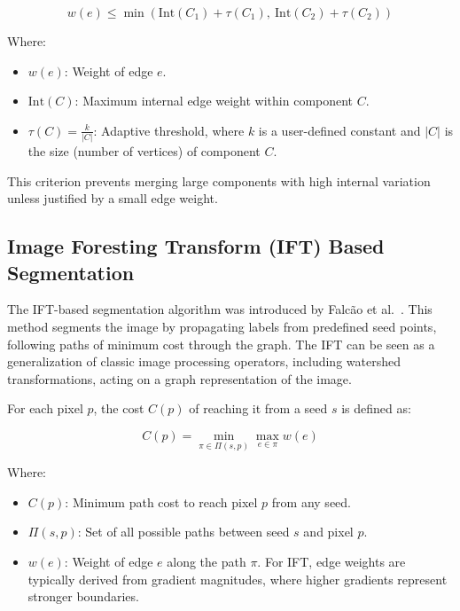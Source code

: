 \documentclass{sbc2023}
\begin{document}
\begin{equation}
w(e) \leq \min\left(\text{Int}(C_1) + \tau(C_1),\ \text{Int}(C_2) + \tau(C_2)\right)
\label{eq:mst_condition}
\end{equation}

Where:

\begin{itemize}
    \item \( w(e) \): Weight of edge \( e \).
    \item \( \text{Int}(C) \): Maximum internal edge weight within component \( C \).
    \item \( \tau(C) = \frac{k}{|C|} \): Adaptive threshold, where \( k \) is a user-defined constant and \( |C| \) is the size (number of vertices) of component \( C \).
\end{itemize}

This criterion prevents merging large components with high internal variation unless justified by a small edge weight.

\subsection{Image Foresting Transform (IFT) Based Segmentation}

The IFT-based segmentation algorithm was introduced by Falcão et al.~\cite{falcao2004image}. This method segments the image by propagating labels from predefined seed points, following paths of minimum cost through the graph. The IFT can be seen as a generalization of classic image processing operators, including watershed transformations, acting on a graph representation of the image.

For each pixel \( p \), the cost \( C(p) \) of reaching it from a seed \( s \) is defined as:

\begin{equation}
C(p) = \min_{\pi \in \Pi(s, p)} \max_{e \in \pi} w(e)
\label{eq:ift_cost}
\end{equation}

Where:

\begin{itemize}
    \item \( C(p) \): Minimum path cost to reach pixel \( p \) from any seed.
    \item \( \Pi(s, p) \): Set of all possible paths between seed \( s \) and pixel \( p \).
    \item \( w(e) \): Weight of edge \( e \) along the path \( \pi \). For IFT, edge weights are typically derived from gradient magnitudes, where higher gradients represent stronger boundaries.
\end{itemize}
\end{document}
